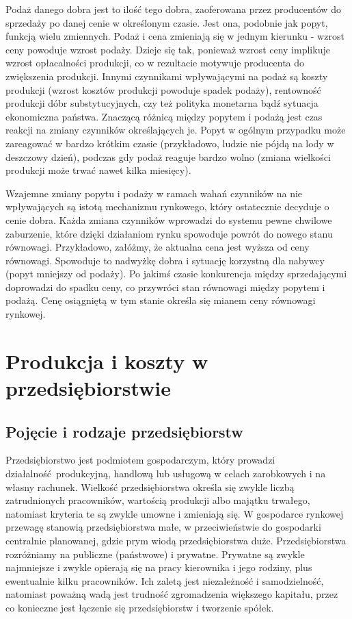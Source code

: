 \documentclass[12pt]{extarticle}
\begin{document}
Podaż danego dobra jest to ilość tego dobra, zaoferowana przez producentów do sprzedaży po danej cenie w określonym czasie. Jest ona, podobnie jak popyt, funkcją wielu zmiennych. Podaż i cena zmieniają się w jednym kierunku - wzrost ceny powoduje wzrost podaży. Dzieje się tak, ponieważ wzrost ceny implikuje wzrost opłacalności produkcji, co w rezultacie motywuje producenta do zwiększenia produkcji. Innymi czynnikami wpływającymi na podaż są koszty produkcji (wzrost kosztów produkcji powoduje spadek podaży), rentowność produkcji dóbr substytucyjnych, czy też polityka monetarna bądź sytuacja ekonomiczna państwa. Znaczącą różnicą między popytem i podażą jest czas reakcji na zmiany czynników określających je. Popyt w ogólnym przypadku może zareagować w bardzo krótkim czasie (przykładowo, ludzie nie pójdą na lody w deszczowy dzień), podczas gdy podaż reaguje bardzo wolno (zmiana wielkości produkcji może trwać nawet kilka miesięcy).


Wzajemne zmiany popytu i podaży w ramach wahań czynników na nie wpływających są istotą mechanizmu rynkowego, który ostatecznie decyduje o cenie dobra. Każda zmiana czynników wprowadzi do systemu pewne chwilowe zaburzenie, które dzięki działaniom rynku spowoduje powrót do nowego stanu równowagi. Przykładowo, załóżmy, że aktualna cena jest wyższa od ceny równowagi. Spowoduje to nadwyżkę dobra i sytuację korzystną dla nabywcy (popyt mniejszy od podaży). Po jakimś czasie konkurencja między sprzedającymi doprowadzi do spadku ceny, co przywróci stan równowagi między popytem i podażą. Cenę osiągniętą w tym stanie określa się mianem ceny równowagi rynkowej.



\section{Produkcja i koszty w przedsiębiorstwie}

\subsection{Pojęcie i rodzaje przedsiębiorstw}

Przedsiębiorstwo jest podmiotem gospodarczym, który prowadzi działalność produkcyjną, handlową lub usługową w celach zarobkowych i na własny rachunek. Wielkość przedsiębiorstwa określa się zwykle liczbą zatrudnionych pracowników, wartością produkcji albo majątku trwałego, natomiast kryteria te są zwykle umowne i zmieniają się. W gospodarce rynkowej przewagę stanowią przedsiębiorstwa małe, w przeciwieństwie do gospodarki centralnie planowanej, gdzie prym wiodą przedsiębiorstwa duże. Przedsiębiorstwa rozróżniamy na publiczne (państwowe) i prywatne. Prywatne są zwykle najmniejsze i zwykle opierają się na pracy kierownika i jego rodziny, plus ewentualnie kilku pracowników. Ich zaletą jest niezależność i samodzielność, natomiast poważną wadą jest trudność zgromadzenia większego kapitału, przez co konieczne jest łączenie się przedsiębiorstw i tworzenie spółek.
\end{document}
